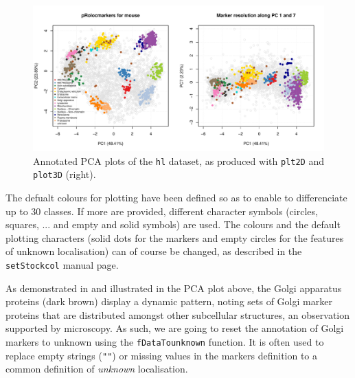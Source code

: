 \begin{figure}[!ht]
  \centering
\begin{knitrout}
\color{fgcolor}\begin{kframe}
\begin{alltt}
\hlstd{(} \hlstd{=} \hlstd{(}\hlstd{,} \hlstd{))}
  \hlstd{=} \hlstd{)}
  \hlstd{=} \hlstd{)}
  \hlstd{=} \hlstd{(}\hlstd{,} \hlstd{),}  \hlstd{=} \hlstd{)}
\end{alltt}
\end{kframe}
\includegraphics[width=\textwidth]{figure/plotmarkers-1} 

\end{knitrout}
\caption{Annotated PCA plots of the \texttt{hl} dataset, as produced
  with \texttt{plt2D} and \texttt{plot3D} (right).}
  \label{fig:plotmarkers}
\end{figure}


The defualt colours for plotting have been defined so as to enable to
differenciate up to 30 classes. If more are provided, different
character symbols (circles, squares, ... and empty and solid symbols)
are used. The colours and the default plotting characters (solid dots
for the markers and empty circles for the features of unknown
localisation) can of course be changed, as described in the
\texttt{setStockcol} manual page.

As demonstrated in \cite{hyper} and illustrated in the PCA plot above,
the Golgi apparatus proteins (dark brown) display a dynamic pattern,
noting sets of Golgi marker proteins that are distributed amongst
other subcellular structures, an observation supported by microscopy.
As such, we are going to reset the annotation of Golgi markers to
unknown using the \texttt{fDataTounknown} function. It is often used
to replace empty strings (\texttt{""}) or missing values in the
markers definition to a common definition of \textit{unknown}
localisation.

